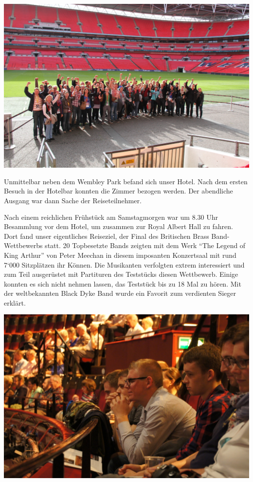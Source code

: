\begin{history}
    \begin{MulticolFigure}
        \centering
        \includegraphics[width=0.93\linewidth]{./chap/2001-2024/2014/Wembley-Gruppe.jpg}
    \end{MulticolFigure}

    Unmittelbar neben dem Wembley Park befand sich unser Hotel. Nach dem ersten
    Besuch in der Hotelbar konnten die Zimmer bezogen werden. Der abendliche
    Ausgang war dann Sache der Reiseteilnehmer.

    Nach einem reichlichen Frühstück am Samstagmorgen war um 8.30 Uhr Besammlung
    vor dem Hotel, um zusammen zur Royal Albert Hall zu fahren. Dort fand unser
    eigentliches Reiseziel, der Final des Britischen Brass Band-Wettbewerbs
    statt. 20 Topbesetzte Bands zeigten mit dem Werk \enquote{The Legend of King
        Arthur} von Peter Meechan in diesem imposanten Konzertsaal mit rund 7‘000
    Sitzplätzen ihr Können. Die Musikanten verfolgten extrem interessiert und
    zum Teil ausgerüstet mit Partituren des Teststücks diesen Wettbewerb. Einige
    konnten es sich nicht nehmen lassen, das Teststück bis zu 18 Mal zu hören.
    Mit der weltbekannten Black Dyke Band wurde ein Favorit zum verdienten
    Sieger erklärt.

    \begin{MulticolFigure}
        \centering
        \includegraphics[width=0.93\linewidth]{./chap/2001-2024/2014/Britisch-Open-Royal-Alber-Hall.jpg}
    \end{MulticolFigure}


\end{history}
